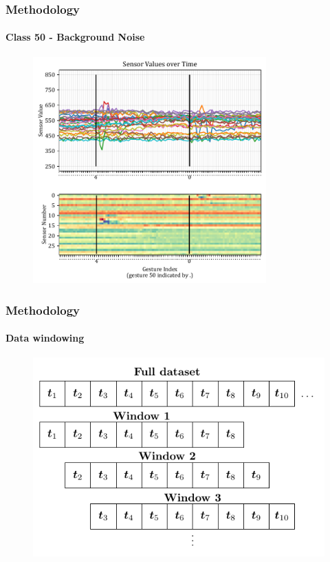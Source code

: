 \documentclass[xcolor={svgnames,table},10pt,fleqn]{beamer}
\begin{document}
\begin{frame}
    \frametitle{Methodology}
    \framesubtitle{Class 50 - Background Noise}

    \begin{figure}[h]
        \centering
        \includegraphics[width=0.8\textwidth]{imgs/04_sensors_over_time.pdf}
    \end{figure}
\end{frame}

\begin{frame}
    \frametitle{Methodology}
    \framesubtitle{Data windowing}
    \begin{figure}[h]
        \centering
        \includegraphics[width=\textwidth]{imgs/windowing_tikz.pdf}
    \end{figure}
\end{frame}
\end{document}
